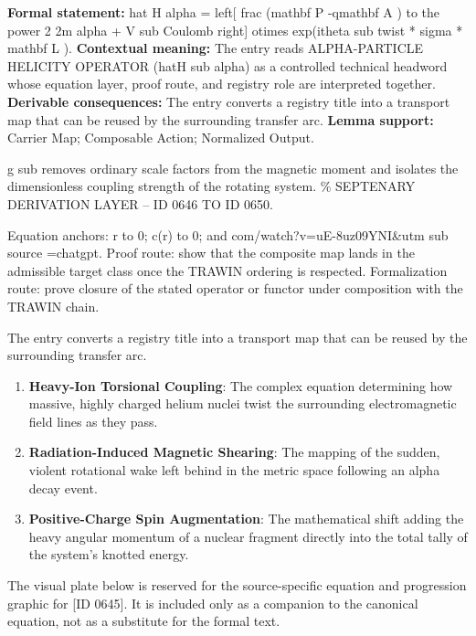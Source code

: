 \begingroup\footnotesize\setlength{\emergencystretch}{3em}\sloppy
\textbf{Formal statement:} hat H alpha = left[ frac (mathbf P -qmathbf A ) to the power 2 2m alpha + V sub Coulomb right] otimes exp(itheta sub twist * sigma * mathbf L ). \textbf{Contextual meaning:} The entry reads ALPHA-PARTICLE HELICITY OPERATOR (hatH sub alpha) as a controlled technical headword whose equation layer, proof route, and registry role are interpreted together. \textbf{Derivable consequences:} The entry converts a registry title into a transport map that can be reused by the surrounding transfer arc. \textbf{Lemma support:} Carrier Map; Composable Action; Normalized Output.\par
\endgroup

g sub removes ordinary scale factors from the magnetic moment and isolates the dimensionless coupling strength of the rotating system. \% SEPTENARY DERIVATION LAYER -- ID 0646 TO ID 0650.

Equation anchors: r to 0; c(r) to 0; and com/watch?v=uE-8uz09YNI\&utm sub source =chatgpt. Proof route: show that the composite map lands in the admissible target class once the TRAWIN ordering is respected. Formalization route: prove closure of the stated operator or functor under composition with the TRAWIN chain.

The entry converts a registry title into a transport map that can be reused by the surrounding transfer arc.
\endgroup

\begin{enumerate}[leftmargin=1.6em,itemsep=6pt,topsep=4pt]
\item \textbf{Heavy-Ion Torsional Coupling}: The complex equation determining how massive, highly charged helium nuclei twist the surrounding electromagnetic field lines as they pass.
\item \textbf{Radiation-Induced Magnetic Shearing}: The mapping of the sudden, violent rotational wake left behind in the metric space following an alpha decay event.
\item \textbf{Positive-Charge Spin Augmentation}: The mathematical shift adding the heavy angular momentum of a nuclear fragment directly into the total tally of the system's knotted energy.
\end{enumerate}

\begingroup\footnotesize\sloppy
The visual plate below is reserved for the source-specific equation and progression graphic for [ID 0645]. It is included only as a companion to the canonical equation, not as a substitute for the formal text.
\par\endgroup
\ifTZPDarkEdition
{}
\fi


